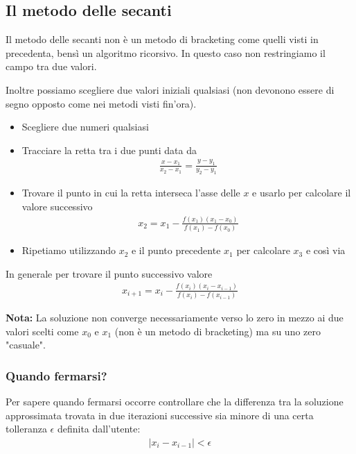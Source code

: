 \documentclass[../main.tex]{subfiles}
\begin{document}
\pagebreak
\subsection{Il metodo delle secanti}
Il metodo delle secanti non è un metodo di bracketing come quelli visti in precedenta, bensì un algoritmo ricorsivo.
In questo caso non restringiamo il campo tra due valori.

Inoltre possiamo scegliere due valori iniziali qualsiasi (non devonono essere di segno opposto come nei metodi visti fin'ora).

\begin{itemize}
    \item Scegliere due numeri qualsiasi
    \item Tracciare la retta tra i due punti data da \begin{align*}
        \frac{x - x_1}{x_2 - x_1} = \frac{y - y_1}{y_2 - y_1}
    \end{align*}
    \item Trovare il punto in cui la retta interseca l'asse delle $x$ e usarlo per calcolare il valore successivo \begin{align*}
        x_2 = x_1 - \frac{f(x_1) (x_1 - x_0)}{f(x_1) - f(x_0)}
    \end{align*}
    \item Ripetiamo utilizzando $x_2$ e il punto precedente $x_1$ per calcolare $x_3$ e così via
\end{itemize}

In generale per trovare il punto successivo valore
\begin{align*}
    x_{i+1} = x_i - \frac{f(x_i) (x_i - x_{i-1})}{f(x_i) - f(x_{i-1})}
\end{align*}

\textbf{Nota:} La soluzione non converge necessariamente verso lo zero in mezzo ai due valori scelti come $x_0$ e $x_1$ (non è un metodo
di bracketing) ma su uno zero "casuale".

\vspace{0.5cm}
\subsubsection{Quando fermarsi?}
Per sapere quando fermarsi occorre controllare che la differenza tra la soluzione approssimata trovata in
due iterazioni successive sia minore di una certa tolleranza $\epsilon$ definita dall’utente:
\begin{align*}
    \left\lvert x_i - x_{i-1}  \right\rvert < \epsilon
\end{align*}
\end{document}
